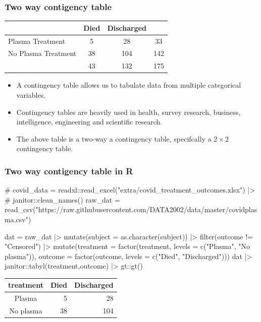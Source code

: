 \documentclass[a4paper]{article}\usepackage[]{graphicx}\usepackage[]{xcolor}
\begin{document}
\subsubsection{Two way contigency table}
\begin{table}[H]
	\centering
	\begin{tabular}{@{}lccc@{}}
	\toprule
						& Died & Discharged &     \\ \midrule
	Plasma Treatment    & 5    & 28         & 33  \\
	No Plasma Treatment & 38   & 104        & 142 \\ \midrule
						& 43   & 132        & 175 \\ \bottomrule
	\end{tabular}
\end{table}
\begin{itemize}
	\item A contingency table allows us to tabulate data from multiple categorical variables.
	\item Contingency tables are heavily used in health, survey research, business, intelligence, engineering and scientific research.
	\item The above table is a two-way a contingency table, specifcally a \( 2 \times 2 \) contingency table.
\end{itemize}
\subsubsection{Two way contigency table in R}
\begin{Schunk}
\begin{Sinput}
# covid_data = readxl::read_excel("extra/covid_treatment_outcomes.xlsx") |>
#   janitor::clean_names()
raw_dat = read_csv("https://raw.githubusercontent.com/DATA2002/data/master/covidplasma.csv")


dat = raw_dat |>
	  mutate(subject = as.character(subject)) |> 
	  filter(outcome != "Censored") |>
	  mutate(treatment = factor(treatment, levels = c("Plasma", "No plasma")),
	  outcome = factor(outcome, levels = c("Died", "Discharged"))) 
dat |>
  janitor::tabyl(treatment,outcome) |>
gt::gt()
\end{Sinput}
\begin{longtable}{crr}
\toprule
treatment & Died & Discharged \\ 
\midrule\addlinespace[2.5pt]
Plasma & 5 & 28 \\ 
No plasma & 38 & 104 \\ 
\bottomrule
\end{longtable}
\end{Schunk}
\end{document}
